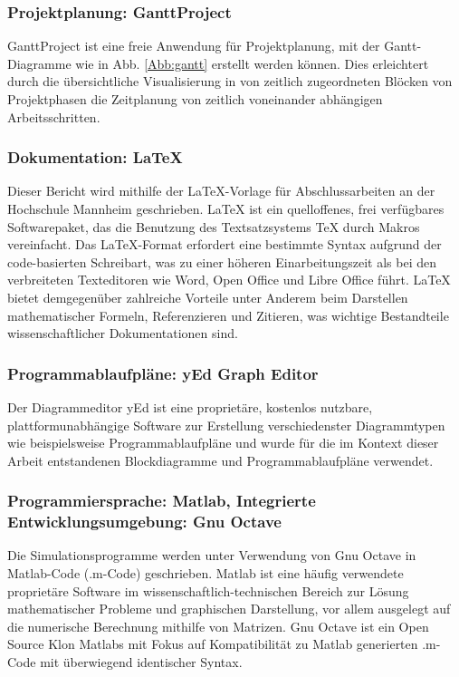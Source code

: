 		\subsubsection{Projektplanung: GanttProject}
			GanttProject ist eine freie Anwendung für Projektplanung, mit der Gantt-Diagramme wie in Abb. \ref{Abb:gantt} erstellt werden können. Dies erleichtert durch die übersichtliche Visualisierung in von zeitlich zugeordneten Blöcken von Projektphasen die Zeitplanung von zeitlich voneinander abhängigen Arbeitsschritten. \cite{gantt}
		
		\subsubsection{Dokumentation: LaTeX}
			Dieser Bericht wird mithilfe der LaTeX-Vorlage für Abschlussarbeiten an der Hochschule Mannheim geschrieben. \cite{latex_template} LaTeX ist ein quelloffenes, frei verfügbares Softwarepaket, das die Benutzung des Textsatzsystems TeX durch Makros vereinfacht. Das LaTeX-Format erfordert eine bestimmte Syntax aufgrund der code-basierten Schreibart, was zu einer höheren Einarbeitungszeit als bei den verbreiteten Texteditoren wie Word, Open Office und Libre Office führt. LaTeX bietet demgegenüber zahlreiche Vorteile unter Anderem beim Darstellen mathematischer Formeln, Referenzieren und Zitieren, was wichtige Bestandteile wissenschaftlicher Dokumentationen sind. \\
			
		\subsubsection{Programmablaufpläne: yEd Graph Editor}
			Der Diagrammeditor yEd ist eine proprietäre, kostenlos nutzbare, plattformunabhängige Software zur Erstellung verschiedenster Diagrammtypen wie beispielsweise Programmablaufpläne und wurde für die im Kontext dieser Arbeit entstandenen Blockdiagramme und Programmablaufpläne verwendet. \cite{yed}
			
		\subsubsection{Programmiersprache: Matlab, Integrierte Entwicklungsumgebung: Gnu Octave}
			Die Simulationsprogramme werden unter Verwendung von Gnu Octave in Matlab-Code (.m-Code) geschrieben. Matlab ist eine häufig verwendete proprietäre Software im wissenschaftlich-technischen Bereich zur Lösung mathematischer Probleme und graphischen Darstellung, vor allem ausgelegt auf die numerische Berechnung mithilfe von Matrizen. Gnu Octave ist ein Open Source Klon Matlabs mit Fokus auf Kompatibilität zu Matlab generierten .m-Code mit überwiegend identischer Syntax. \\
	